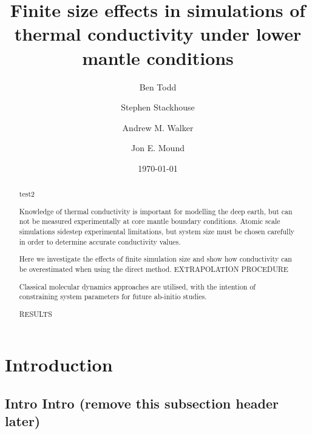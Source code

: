 \documentclass[%
preprint,                                  %
nofootinbib,
 amsmath,amssymb,
 aps,
]{revtex4-1}
\begin{document}
\newcommand{\wmk}{Wm$^{-1}$K$^{-1}$}


\title{Finite size effects in simulations of thermal conductivity under lower mantle conditions}%

\author{Ben Todd}
\author{Stephen Stackhouse}
\author{Andrew M. Walker}
\author{Jon E. Mound}


\date{\today}%

\begin{abstract}
test2

Knowledge of thermal conductivity is important for modelling the deep earth, but can not be measured experimentally at core mantle boundary conditions. Atomic scale simulations sidestep experimental limitations, but system size must be chosen carefully in order to determine accurate conductivity values.

Here we investigate the effects of finite simulation size and show how conductivity can be overestimated when using the direct method. EXTRAPOLATION PROCEDURE

Classical molecular dynamics approaches are utilised, with the intention of constraining system parameters for future ab-initio studies.

RESULTS
\end{abstract}

\maketitle




\section{\label{sec:intro}Introduction}

\subsection{\label{sec:intro.intro}Intro Intro (remove this subsection header later)}
\end{document}
